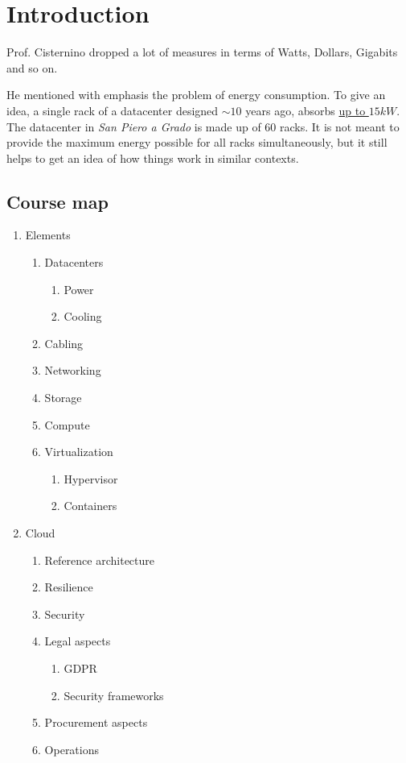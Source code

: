 \chapter{Introduction}

Prof. Cisternino dropped a lot of measures in terms of Watts, Dollars, Gigabits and so on.

He mentioned with emphasis the problem of energy consumption.
To give an idea, a single rack of a datacenter designed $\sim10$ years ago, absorbs \ul{up to $15kW$}.
The datacenter in \textit{San Piero a Grado} is made up of 60 racks. It is not meant to provide the maximum energy possible for all racks simultaneously, but it still helps to get an idea of how things work in similar contexts.

\section{Course map}
\begin{enumerate}
   \item Elements
   \begin{enumerate}
      \item Datacenters
      \begin{enumerate}
         \item Power
         \item Cooling
      \end{enumerate}
      \item Cabling
      \item Networking
      \item Storage
      \item Compute
      \item Virtualization
      \begin{enumerate}
         \item Hypervisor
         \item Containers
      \end{enumerate}
   \end{enumerate}
   \item Cloud
   \begin{enumerate}
      \item Reference architecture
      \item Resilience
      \item Security
      \item Legal aspects
      \begin{enumerate}
         \item GDPR
         \item Security frameworks
      \end{enumerate}
      \item Procurement aspects
      \item Operations
   \end{enumerate}
\end{enumerate}